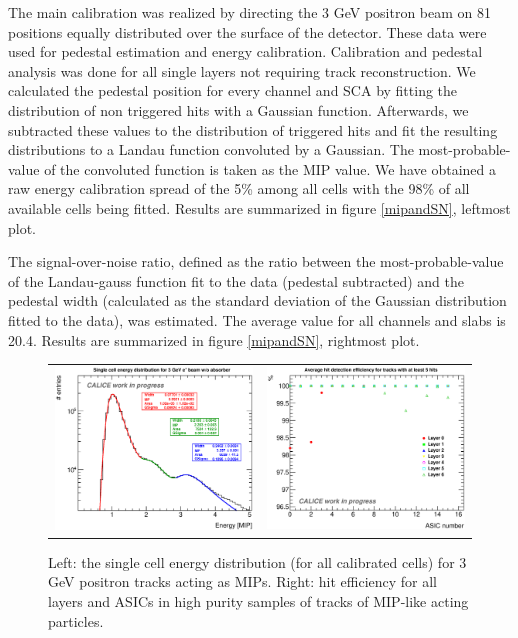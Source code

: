 \documentclass[a4paper,11pt]{article}
\begin{document}
The main calibration was realized 
by directing the 3 GeV positron beam on 81 positions equally distributed over the surface of the detector.
These data were used for pedestal estimation and energy calibration.
Calibration and pedestal analysis was done for all single layers not requiring track reconstruction.
We calculated the pedestal position for every channel and SCA by fitting the distribution of non triggered hits with a Gaussian function.
Afterwards, we subtracted these values to the distribution of triggered hits and fit the resulting distributions to a Landau function convoluted by a Gaussian.
The most-probable-value of the convoluted function is taken as the MIP value.
We have obtained a raw energy calibration spread of the 5\% among all cells with the 98\% of all available cells being fitted. Results are summarized in figure \ref{mipandSN}, leftmost plot.

The signal-over-noise ratio, defined as the ratio between the most-probable-value of
the Landau-gauss function fit to the data (pedestal subtracted) and the pedestal width
(calculated as the standard deviation of the Gaussian distribution fitted to the data), was estimated.
The average value for all channels and slabs is 20.4.
Results are summarized in figure \ref{mipandSN}, rightmost plot.

\begin{figure}[!t]
  \centering
    \begin{tabular}{ll}
      \includegraphics[width=2.6in]{figures/MIP3peaks.eps} & \includegraphics[width=2.6in]{figures/MIPefficiency_hitsintrack5_hitouttrack0_bcidcut2850_chip.eps} \\
    \end{tabular}
    \caption{Left: the single cell energy distribution (for all calibrated cells) for 3 GeV positron tracks acting as MIPs. Right: hit efficiency for all layers and ASICs in high purity samples of tracks of MIP-like acting particles.}
\label{miplog}
\end{figure}
\end{document}
